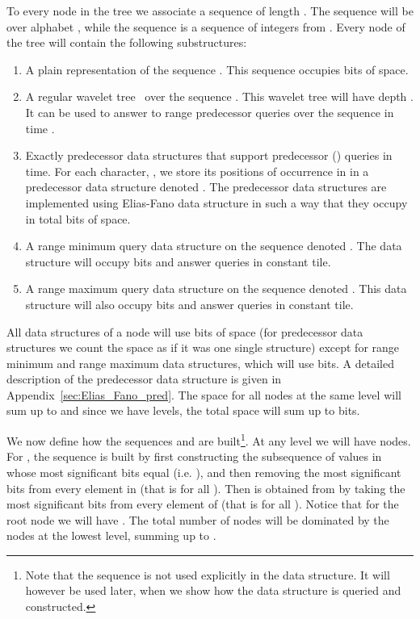 \documentclass[11pt,runningheads]{llncs}
\begin{document}
{To every node  in the tree we associate 
a sequence  of length . 
The sequence  will be over alphabet ,  
while the sequence  is a sequence of integers from . 
Every node of the tree will contain the following substructures: 
\begin{enumerate}
\item A plain representation of the sequence . This sequence occupies  bits of space. 
\item A regular wavelet tree~\cite{GGV03}  over the sequence . This wavelet tree will have 
depth . It can be used to answer to range predecessor queries over the sequence 
in time . 
\item Exactly  predecessor data structures that support 
predecessor () queries in  time. For each character, , 
we store its positions of occurrence in  in a predecessor data structure
denoted . The predecessor data structures are implemented using Elias-Fano 
data structure in such a way that they occupy in total  bits of space. 
\item A range minimum query data structure on the sequence  denoted . 
The data structure will occupy  bits and answer queries in constant tile. 
\item A range maximum query data structure on the sequence  denoted .
This data structure will also occupy  bits and answer queries in constant tile. 
\end{enumerate}
All data structures of a node  will use  bits 
of space  (for predecessor data structures we count the space as if it was 
one single structure)
except for range minimum and range maximum 
data structures, which will use  bits. 
A detailed description of the predecessor data structure 
is given in Appendix~\ref{sec:Elias_Fano_pred}. The space for all nodes 
at the same level will sum up to  and since we have 
 levels, the total space will sum up to 
bits. 

We now define how the sequences  and  
are built\footnote{Note that the sequence  is not used 
explicitly in the data structure. It will however be used later, 
when we show how the data structure is queried and constructed.}. 
At any level  we will have 
nodes. For , the sequence 
is built by first constructing the subsequence  of  values in  whose 
most significant bits equal  (i.e. ), 
and then removing the most significant  bits from every element in 
(that is  for all 
). 
Then  is obtained from 
 by taking the most significant  bits from every element 
of  (that is  for all 
). Notice that for the root node we will have . 
The total number of nodes will be dominated by the nodes at the lowest level, 
summing up to . 

}
\end{document}
